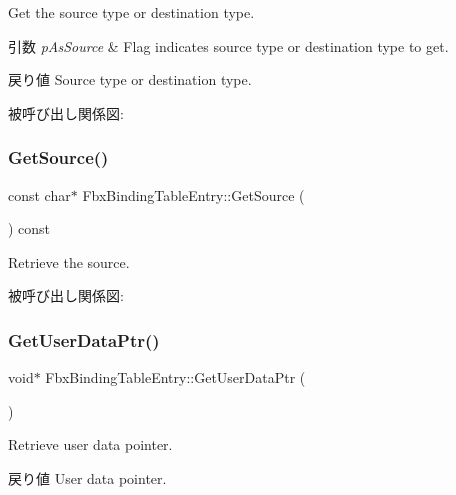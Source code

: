 Get the source type or destination type. 
\begin{DoxyParams}{引数}
{\em p\+As\+Source} & Flag indicates source type or destination type to get. \\
\hline
\end{DoxyParams}
\begin{DoxyReturn}{戻り値}
Source type or destination type. 
\end{DoxyReturn}
被呼び出し関係図\+:
\mbox{\label{class_fbx_binding_table_entry_a0c5a62a50a5fbc5408ab3ec1af16518f}} 
\subsubsection{\texorpdfstring{Get\+Source()}{GetSource()}}
{\footnotesize\ttfamily const char$\ast$ Fbx\+Binding\+Table\+Entry\+::\+Get\+Source (\begin{DoxyParamCaption}{ }\end{DoxyParamCaption}) const}



Retrieve the source. 

被呼び出し関係図\+:
\mbox{\label{class_fbx_binding_table_entry_a108bed4ff64375a63667fb20eb24ec8d}} 
\subsubsection{\texorpdfstring{Get\+User\+Data\+Ptr()}{GetUserDataPtr()}\hspace{0.1cm}{\footnotesize\ttfamily [1/2]}}
{\footnotesize\ttfamily void$\ast$ Fbx\+Binding\+Table\+Entry\+::\+Get\+User\+Data\+Ptr (\begin{DoxyParamCaption}{ }\end{DoxyParamCaption})}

Retrieve user data pointer. \begin{DoxyReturn}{戻り値}
User data pointer. 
\end{DoxyReturn}
\mbox{\label{class_fbx_binding_table_entry_aa9f5f5064caf0f961464d2555e3336ba}} 
